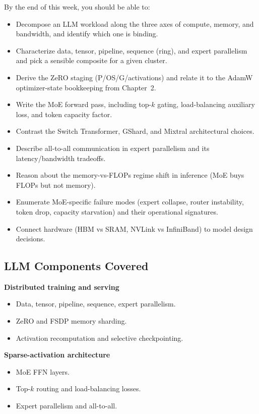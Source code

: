 By the end of this week, you should be able to:
\begin{itemize}
  \item Decompose an LLM workload along the three axes of compute,
        memory, and bandwidth, and identify which one is binding.
  \item Characterize data, tensor, pipeline, sequence (ring), and
        expert parallelism and pick a sensible composite for a given
        cluster.
  \item Derive the ZeRO staging (P/OS/G/activations) and relate it to
        the AdamW optimizer-state bookkeeping from Chapter~2.
  \item Write the MoE forward pass, including top-$k$ gating,
        load-balancing auxiliary loss, and token capacity factor.
  \item Contrast the Switch Transformer, GShard, and Mixtral
        architectural choices.
  \item Describe all-to-all communication in expert parallelism and
        its latency/bandwidth tradeoffs.
  \item Reason about the memory-vs-FLOPs regime shift in inference
        (MoE buys FLOPs but not memory).
  \item Enumerate MoE-specific failure modes (expert collapse, router
        instability, token drop, capacity starvation) and their
        operational signatures.
  \item Connect hardware (HBM vs SRAM, NVLink vs InfiniBand) to model
        design decisions.
\end{itemize}

\subsection{LLM Components Covered}

\textbf{Distributed training and serving}
\begin{itemize}
  \item Data, tensor, pipeline, sequence, expert parallelism.
  \item ZeRO and FSDP memory sharding.
  \item Activation recomputation and selective checkpointing.
\end{itemize}

\textbf{Sparse-activation architecture}
\begin{itemize}
  \item MoE FFN layers.
  \item Top-$k$ routing and load-balancing losses.
  \item Expert parallelism and all-to-all.
\end{itemize}

